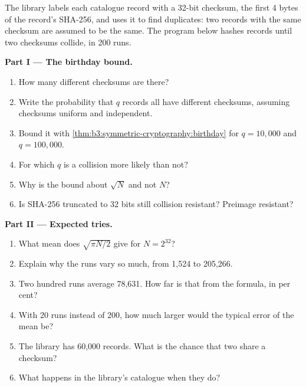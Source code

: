 \begin{problem}\label{pb:b3:symmetric-cryptography:1}
The library labels each catalogue record with a 32-bit checksum, the first 4 bytes of the record's SHA-256, and uses it to find duplicates: two records with the same checksum are assumed to be the same. The program below hashes records until two checksums collide, in 200 runs.

\label{lst:b3:symmetric-cryptography:birthday}

\label{out:b3:symmetric-cryptography:birthday}

\medskip\noindent\textbf{Part I --- The birthday bound.}
\begin{enumerate}
  \item How many different checksums are there?
  \item Write the probability that $q$ records all have different checksums, assuming checksums uniform and independent.
  \item Bound it with \cref{thm:b3:symmetric-cryptography:birthday} for $q = 10{,}000$ and $q = 100{,}000$.
  \item For which $q$ is a collision more likely than not?
  \item Why is the bound about $\sqrt{N}$ and not $N$?
  \item Is SHA-256 truncated to 32 bits still collision resistant? Preimage resistant?
\end{enumerate}

\medskip\noindent\textbf{Part II --- Expected tries.}
\begin{enumerate}[resume]
  \item What mean does $\sqrt{\pi N / 2}$ give for $N = 2^{32}$?
  \item Explain why the runs vary so much, from 1,524 to 205,266.
  \item Two hundred runs average 78,631. How far is that from the formula, in per cent?
  \item With 20 runs instead of 200, how much larger would the typical error of the mean be?
  \item The library has 60,000 records. What is the chance that two share a checksum?
  \item What happens in the library's catalogue when they do?
\end{enumerate}


\end{problem}

